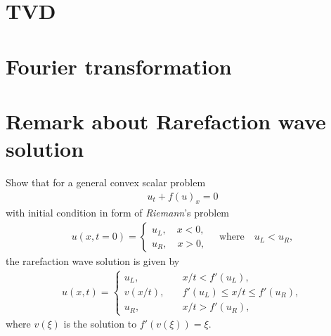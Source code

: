 \documentclass[12pt]{article}
\begin{document}
\section{TVD}

\section{Fourier transformation}

\section{Remark about Rarefaction wave solution}
\begin{example}
	Show that for a general convex scalar problem 
	\begin{align*}
		u_t + f(u)_x = 0	
	\end{align*}
	with initial condition
	in form of \emph{Riemann}'s problem 
	\begin{align*}
		u(x,t=0) = 
		\begin{cases}
			u_L, \quad x<0, \\
			u_R, \quad x>0,
		\end{cases}
		\quad\text{where}\quad
		u_L<u_R,
	\end{align*}
	the rarefaction wave solution
	is given by 
	\begin{align*}
		u(x,t) =
		\begin{cases} 
			u_L,    & \quad x/t < f'(u_L),                 \\
			v(x/t), & \quad f'(u_L) \leq x/t \leq f'(u_R), \\
			u_R,    & \quad x/t > f'(u_R),
		\end{cases}
	\end{align*}
	where $v(\xi)$ is the solution to $f'(v(\xi)) = \xi$.
\end{example}

\end{document}
